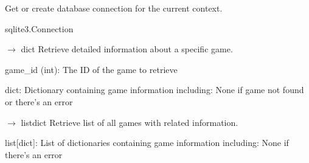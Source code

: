 \documentclass[letterpaper,10pt,english]{sphinxmanual}
\begin{document}

\begin{fulllineitems}
\label{\detokenize{store-service:db_api.get_db}}
\pysigstartsignatures
\pysiglinewithargsret
{}
{}
{}
\pysigstopsignatures
\sphinxAtStartPar
Get or create database connection for the current context.
\begin{description}
\sphinxAtStartPar
sqlite3.Connection

\end{description}

\end{fulllineitems}


\begin{fulllineitems}
\label{\detokenize{store-service:db_api.get_game_by_id}}
\pysigstartsignatures
\pysiglinewithargsret
{}
{}
{{ $\rightarrow$ dict}}
\pysigstopsignatures
\sphinxAtStartPar
Retrieve detailed information about a specific game.
\begin{description}
\sphinxAtStartPar
game\_id (int): The ID of the game to retrieve

\sphinxAtStartPar
dict: Dictionary containing game information including:
None if game not found or there’s an error

\end{description}

\end{fulllineitems}


\begin{fulllineitems}
\label{\detokenize{store-service:db_api.get_games_list}}
\pysigstartsignatures
\pysiglinewithargsret
{}
{}
{{ $\rightarrow$ list\DUrole{p}{{[}}dict\DUrole{p}{{]}}}}
\pysigstopsignatures
\sphinxAtStartPar
Retrieve list of all games with related information.
\begin{description}
\sphinxAtStartPar
list{[}dict{]}: List of dictionaries containing game information including:
None if there’s an error

\end{description}

\end{fulllineitems}
\end{document}

